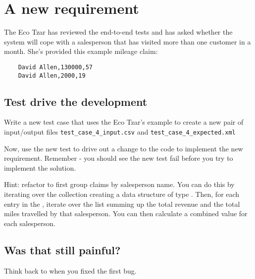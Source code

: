 \chapter*{A new requirement}

The Eco Tzar has reviewed the end-to-end tests and has asked whether the system will cope with a salesperson that has visited more than one customer in a month. She's provided this example mileage claim:

\begin{verbatim}
    David Allen,130000,57
    David Allen,2000,19
\end{verbatim}



\section*{Test drive the development}

Write a new test case that uses the Eco Tzar's example to create a new pair of input/output files \texttt{test_case_4_input.csv} and \texttt{test_case_4_expected.xml}

Now, use the new test to drive out a change to the code to implement the new requirement. Remember - you should see the new test fail before you try to implement the solution.

Hint: refactor \texttt{} to first group claims by salesperson name.  You can do this by iterating over the \texttt{} collection creating a data structure of type \texttt{}. Then, for each entry in the \texttt{}, iterate over the list summing up the total revenue and the total miles travelled by that salesperson. You can then calculate a combined \texttt{} value for each salesperson.

\section*{Was that still painful?}

Think back to when you fixed the first bug.



